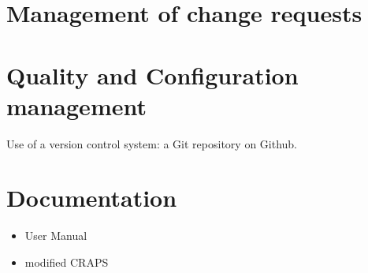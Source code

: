\documentclass{article}
\begin{document}
  \section{Management of change requests}

  \section{Quality and Configuration management}
    Use of a version control system: a Git repository on Github.

  \section{Documentation}
    \begin{itemize}
      \item User Manual
      \item modified CRAPS
    \end{itemize}
\end{document}
